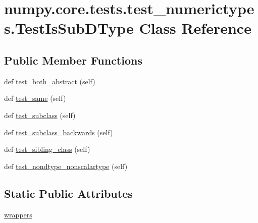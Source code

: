 \hypertarget{classnumpy_1_1core_1_1tests_1_1test__numerictypes_1_1TestIsSubDType}{}\section{numpy.\+core.\+tests.\+test\+\_\+numerictypes.\+Test\+Is\+Sub\+D\+Type Class Reference}
\label{classnumpy_1_1core_1_1tests_1_1test__numerictypes_1_1TestIsSubDType}
\subsection*{Public Member Functions}
\begin{DoxyCompactItemize}
\item 
def \hyperlink{classnumpy_1_1core_1_1tests_1_1test__numerictypes_1_1TestIsSubDType_af83357df3a76e9ad0ba47aeb1bfafb77}{test\+\_\+both\+\_\+abstract} (self)
\item 
def \hyperlink{classnumpy_1_1core_1_1tests_1_1test__numerictypes_1_1TestIsSubDType_aed915c497b384839eccbfa27c2ee078d}{test\+\_\+same} (self)
\item 
def \hyperlink{classnumpy_1_1core_1_1tests_1_1test__numerictypes_1_1TestIsSubDType_a33ac11f477e47a30a08bdc6a20b6f595}{test\+\_\+subclass} (self)
\item 
def \hyperlink{classnumpy_1_1core_1_1tests_1_1test__numerictypes_1_1TestIsSubDType_a77565a8dbe7e6937b4bc9cbe6b55a691}{test\+\_\+subclass\+\_\+backwards} (self)
\item 
def \hyperlink{classnumpy_1_1core_1_1tests_1_1test__numerictypes_1_1TestIsSubDType_a58b8889fd7ecea3896597beb98fa3247}{test\+\_\+sibling\+\_\+class} (self)
\item 
def \hyperlink{classnumpy_1_1core_1_1tests_1_1test__numerictypes_1_1TestIsSubDType_acdd8235a8ea433c68f294a3b744c1339}{test\+\_\+nondtype\+\_\+nonscalartype} (self)
\end{DoxyCompactItemize}
\subsection*{Static Public Attributes}
\begin{DoxyCompactItemize}
\item 
\hyperlink{classnumpy_1_1core_1_1tests_1_1test__numerictypes_1_1TestIsSubDType_a7837d7f1823a217bd7b3ad5f2056cdf8}{wrappers}
\end{DoxyCompactItemize}


